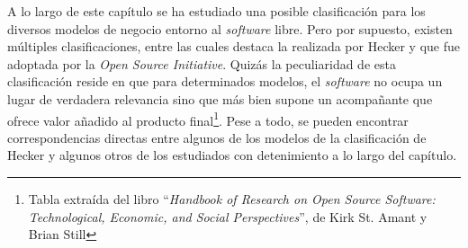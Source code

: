 A lo largo de este capítulo se ha estudiado una posible clasificación para los
diversos modelos de negocio entorno al \textit{software} libre. Pero por
supuesto, existen múltiples clasificaciones, entre las cuales destaca la
realizada por Hecker y que fue adoptada por la \textit{Open Source Initiative}.
Quizás la peculiaridad de esta clasificación reside en que para determinados
modelos, el \textit{software} no ocupa un lugar de verdadera relevancia sino que
más bien supone un acompañante que ofrece valor añadido al producto
final\footnote{Tabla extraída del libro ``\textit{Handbook of Research on Open
Source Software: Technological, Economic, and Social Perspectives}'', de Kirk
St. Amant y Brian Still}. Pese a todo, se pueden encontrar correspondencias
directas entre algunos de los modelos de la clasificación de Hecker y
algunos otros de los estudiados con detenimiento a lo largo del capítulo.

\begin{figure}[htb]
  \centerline{}
  \label{IMG:Hecker}
\end{figure}
